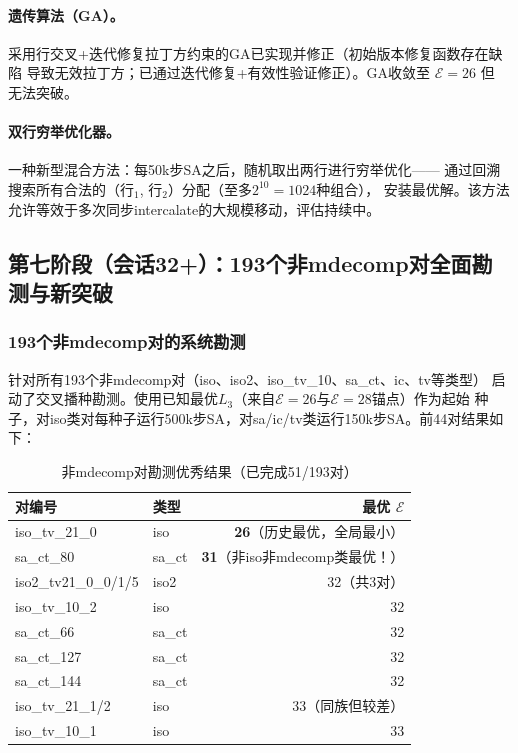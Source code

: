 \documentclass[11pt,a4paper]{ctexart}
\theoremstyle{remark}
\newcommand{\E}{\mathcal{E}}
\begin{document}
\paragraph{遗传算法（GA）。}
采用行交叉+迭代修复拉丁方约束的GA已实现并修正（初始版本修复函数存在缺陷
导致无效拉丁方；已通过迭代修复+有效性验证修正）。GA收敛至 $\E=26$ 但
无法突破。

\paragraph{双行穷举优化器。}
一种新型混合方法：每50k步SA之后，随机取出两行进行穷举优化——
通过回溯搜索所有合法的（行$_1$, 行$_2$）分配（至多$2^{10}=1024$种组合），
安装最优解。该方法允许等效于多次同步intercalate的大规模移动，评估持续中。

\subsection{第七阶段（会话32+）：193个非mdecomp对全面勘测与新突破}

\subsubsection{193个非mdecomp对的系统勘测}

针对所有193个非mdecomp对（iso、iso2、iso\_tv\_10、sa\_ct、ic、tv等类型）
启动了交叉播种勘测。使用已知最优$L_3$（来自$\E=26$与$\E=28$锚点）作为起始
种子，对iso类对每种子运行500k步SA，对sa/ic/tv类运行150k步SA。前44对结果如下：

\begin{table}[h]
\centering
\caption{非mdecomp对勘测优秀结果（已完成51/193对）}
\label{tab:nonmdecomp_zh}
\begin{tabular}{llr}
\toprule
对编号 & 类型 & 最优 $\E$ \\
\midrule
iso\_tv\_21\_0  & iso    & \textbf{26}（历史最优，全局最小）\\
sa\_ct\_80      & sa\_ct & \textbf{31}（非iso非mdecomp类最优！）\\
iso2\_tv21\_0\_0/1/5 & iso2 & 32（共3对）\\
iso\_tv\_10\_2   & iso   & 32\\
sa\_ct\_66      & sa\_ct & 32\\
sa\_ct\_127     & sa\_ct & 32\\
sa\_ct\_144     & sa\_ct & 32\\
iso\_tv\_21\_1/2 & iso   & 33（同族但较差）\\
iso\_tv\_10\_1   & iso   & 33\\
\bottomrule
\end{tabular}
\end{table}
\end{document}
